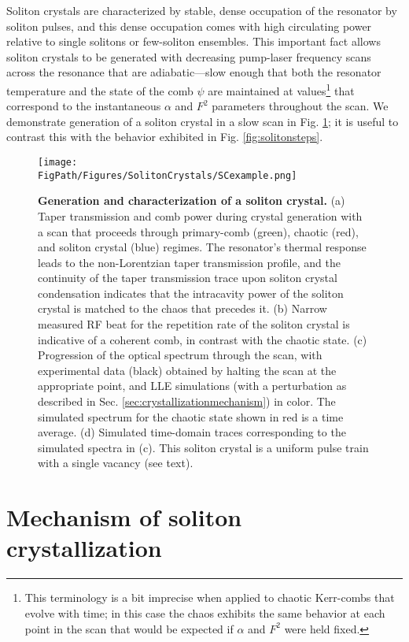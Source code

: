 Soliton crystals are characterized by stable, dense occupation of the resonator by soliton pulses, and this dense occupation comes with high circulating power relative to single solitons or few-soliton ensembles. This important fact allows soliton crystals to be generated with decreasing pump-laser frequency scans across the resonance that are adiabatic---slow enough that both the resonator temperature and the state of the comb $\psi$ are maintained at values\footnote{This terminology is a bit imprecise when applied to chaotic Kerr-combs that evolve with time; in this case the chaos exhibits the same behavior at each point in the scan that would be expected if $\alpha$ and $F^2$ were held fixed.} that correspond to the instantaneous $\alpha$ and $F^2$ parameters throughout the scan. We demonstrate generation of a soliton crystal in a slow scan in Fig. \ref{fig:SCexample}; it is useful to contrast this with the behavior exhibited in Fig. \ref{fig:solitonsteps}. 

\begin{figure}[htpb]
	\begin{center}
		\texttt{[image: \\FigPath/Figures/SolitonCrystals/SCexample.png]}
	\end{center}
	\caption[Generation and characterization of a soliton crystal]{\textbf{Generation and characterization of a soliton crystal.} (a) Taper transmission and comb power during crystal generation with a scan that proceeds through primary-comb (green), chaotic (red), and soliton crystal (blue) regimes. The resonator's thermal response leads to the non-Lorentzian taper transmission profile, and the continuity of the taper transmission trace upon soliton crystal condensation indicates that the intracavity power of the soliton crystal is matched to the chaos that precedes it. (b) Narrow measured RF beat for the repetition rate of the soliton crystal is indicative of a coherent comb, in contrast with the chaotic state. (c) Progression of the optical spectrum through the scan, with experimental data (black) obtained by halting the scan at the appropriate point, and LLE simulations (with a perturbation as described in Sec. \ref{sec:crystallizationmechanism}) in color. The simulated spectrum for the chaotic state shown in red is a time average. (d) Simulated time-domain traces corresponding to the simulated spectra in (c). This soliton crystal is a uniform pulse train with a single vacancy (see text).}
	\label{fig:SCexample}
\end{figure} 

\section{Mechanism of soliton crystallization}

